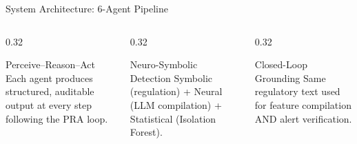 \documentclass[10pt, aspectratio=169]{beamer}
\begin{document}
\begin{frame}{System Architecture: 6-Agent Pipeline}
\begin{center}
\end{center}

\vspace{0.3em}

\begin{columns}[T]
\begin{column}{0.32\textwidth}
  \begin{block}{Perceive--Reason--Act}
    \scriptsize Each agent produces structured, auditable output at every step following the PRA loop.
  \end{block}
\end{column}
\begin{column}{0.32\textwidth}
  \begin{block}{Neuro-Symbolic Detection}
    \scriptsize Symbolic (regulation) + Neural (LLM compilation) + Statistical (Isolation Forest).
  \end{block}
\end{column}
\begin{column}{0.32\textwidth}
  \begin{block}{Closed-Loop Grounding}
    \scriptsize Same regulatory text used for feature compilation AND alert verification.
  \end{block}
\end{column}
\end{columns}
\end{frame}
\end{document}
